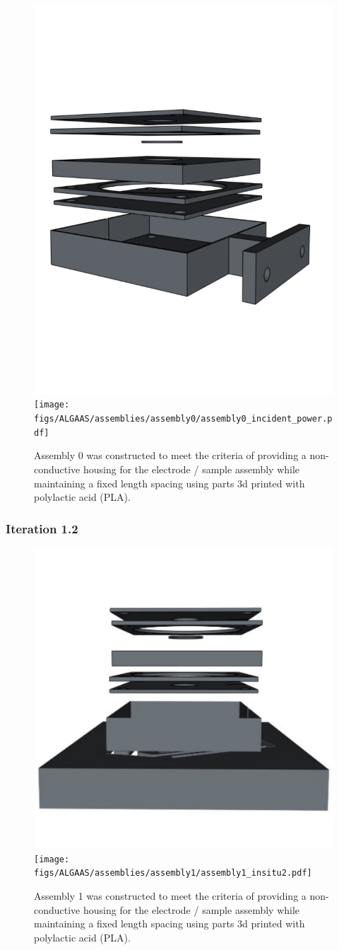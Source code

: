 \begin{figure}[!ht]
	\begin{subcaptiongroup}
		\includegraphics[width=.5\textwidth]{figs/ALGAAS/assemblies/assembly0/assembly0.pdf}
		\label{A0}
		\texttt{[image: figs/ALGAAS/assemblies/assembly0/assembly0\_incident\_power.pdf]}
 		\label{A0inc}
	\end{subcaptiongroup}
  \caption{Assembly 0 was constructed to meet the criteria of providing a non-conductive housing for the electrode / sample assembly while maintaining a fixed length spacing using parts 3d printed with polylactic acid (PLA).}
  \label{fig:assembly0bp}
\end{figure}
\FloatBarrier

\subsubsection{Iteration 1.2}
\begin{figure}[!ht]
	\begin{subcaptiongroup}
		\includegraphics[width=.5\textwidth]{figs/ALGAAS/assemblies/assembly1/assembly1_dissassembled.pdf}
		\label{A1pt2CAD}
		\texttt{[image: figs/ALGAAS/assemblies/assembly1/assembly1\_insitu2.pdf]}
		\label{A1pt2pic}	
	\end{subcaptiongroup}
	\caption{Assembly 1 was constructed to meet the criteria of providing a non-conductive housing for the electrode / sample assembly while maintaining a fixed length spacing using parts 3d printed with polylactic acid (PLA).}
	\label{fig:assembly1bp}
\end{figure}
\FloatBarrier

